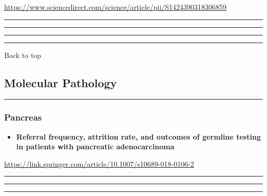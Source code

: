 \documentclass[]{article}
\providecommand{\tightlist}{%
  \setlength{\itemsep}{0pt}\setlength{\parskip}{0pt}}
\begin{document}
\url{https://www.sciencedirect.com/science/article/pii/S1424390318306859}

\begin{center}\rule{0.5\linewidth}{\linethickness}\end{center}

\begin{center}\rule{0.5\linewidth}{\linethickness}\end{center}

\begin{center}\rule{0.5\linewidth}{\linethickness}\end{center}

\begin{center}\rule{0.5\linewidth}{\linethickness}\end{center}

Back to top

\pagebreak

\hypertarget{molecular-pathology}{%
\subsection{Molecular Pathology}\label{molecular-pathology}}

\begin{center}\rule{0.5\linewidth}{\linethickness}\end{center}

\hypertarget{pancreas-2}{%
\subsubsection{Pancreas}\label{pancreas-2}}

\begin{itemize}
\tightlist
\item
  \textbf{Referral frequency, attrition rate, and outcomes of germline
  testing in patients with pancreatic adenocarcinoma}
\end{itemize}

\url{https://link.springer.com/article/10.1007/s10689-018-0106-2}

\begin{center}\rule{0.5\linewidth}{\linethickness}\end{center}

\begin{center}\rule{0.5\linewidth}{\linethickness}\end{center}

\begin{center}\rule{0.5\linewidth}{\linethickness}\end{center}
\end{document}
